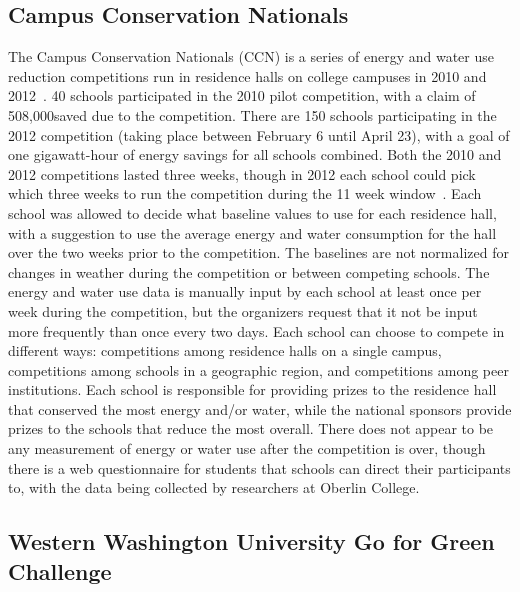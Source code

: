 \subsection{Campus Conservation Nationals}

The Campus Conservation Nationals (CCN) is a series of energy and water use reduction competitions run in residence halls on college campuses in 2010 and 2012~\cite{conservation-nationals-2012}. 40 schools participated in the 2010 pilot competition, with a claim of 508,000\kWh saved due to the competition. There are 150 schools participating in the 2012 competition (taking place between February 6 until April 23), with a goal of one gigawatt-hour of energy savings for all schools combined. Both the 2010 and 2012 competitions lasted three weeks, though in 2012 each school could pick which three weeks to run the competition during the 11 week window~\cite{conservation-nationals-website}. Each school was allowed to decide what baseline values to use for each residence hall, with a suggestion to use the average energy and water consumption for the hall over the two weeks prior to the competition. The baselines are not normalized for changes in weather during the competition or between competing schools. The energy and water use data is manually input by each school at least once per week during the competition, but the organizers request that it not be input more frequently than once every two days. Each school can choose to compete in different ways: competitions among residence halls on a single campus, competitions among schools in a geographic region, and competitions among peer institutions. Each school is responsible for providing prizes to the residence hall that conserved the most energy and/or water, while the national sponsors provide prizes to the schools that reduce the most overall. There does not appear to be any measurement of energy or water use after the competition is over, though there is a web questionnaire for students that schools can direct their participants to, with the data being collected by researchers at Oberlin College.

\subsection{Western Washington University Go for Green Challenge}

